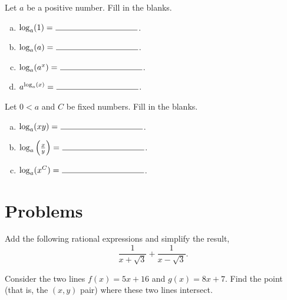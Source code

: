 \documentclass[12pt]{amsart}
\begin{document}
\vspace{1in}

\begin{thm}[4 Points]
  Let $a$ be a positive number.  Fill in the blanks.
  \begin{enumerate}[(a)]
    \vspace{.25in}
  \item
    $\log_a(1) = \ \line(1,0){100}$.
    \vspace{.25in}
  \item
    $\log_a(a) = \ \line(1,0){100}$.
    \vspace{.25in}
  \item
    $\log_a(a^x) = \ \line(1,0){100}$.
    \vspace{.25in}
  \item
    $a^{\log_a(x)} = \ \line(1,0){100}$.
  \end{enumerate}
  \vspace{.5in}
\end{thm}

\begin{thm}[3 Points]
  Let $0 < a$ and $C$ be fixed numbers.  Fill in the blanks.
  \vspace{.25in}
  \begin{enumerate}[(a)]
  \item
    $\log_a(xy) = \ \line(1,0){100}$.
    \vspace{.25in}
  \item
    $\log_a\left(\frac{x}{y}\right) = \ \line(1,0){100}$.
    \vspace{.25in}
  \item
    $\log_a(x^C) = \ \line(1,0){100}$.
  \end{enumerate}
  \vspace{.5in}
\end{thm}

\newpage

\section{Problems}

\begin{thm}[4 Points]
  Add the following rational expressions and simplify the result,
  $$\frac{1}{x + \sqrt{3}} + \frac{1}{x - \sqrt{3}}.$$
  \vspace{3in}
\end{thm}

\begin{thm}[5 Points]
  Consider the two lines $f(x) = 5x + 16$ and $g(x) = 8x + 7$.
  Find the point (that is, the $(x,y)$ pair) where these two lines intersect.
  \vspace{2in}
\end{thm}
\end{document}
